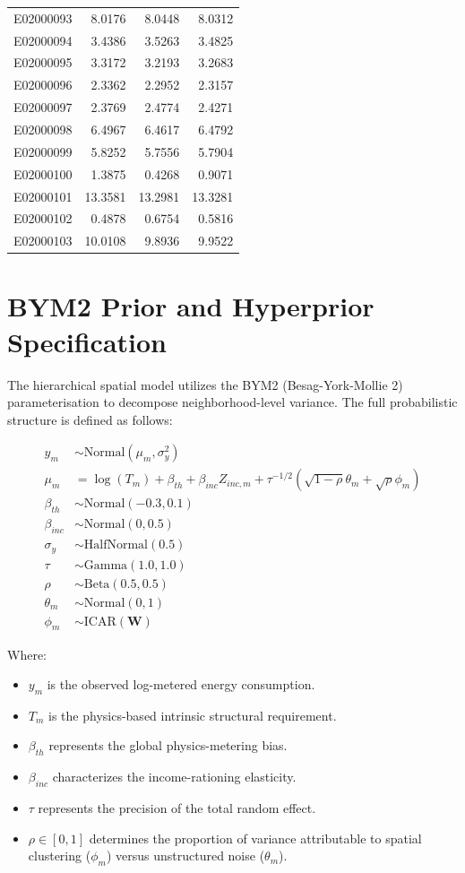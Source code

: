 \documentclass[11pt, a4paper]{article}
\begin{document}
\begin{longtable}{lrrr}
E02000093 & 8.0176 & 8.0448 & 8.0312 \\
E02000094 & 3.4386 & 3.5263 & 3.4825 \\
E02000095 & 3.3172 & 3.2193 & 3.2683 \\
E02000096 & 2.3362 & 2.2952 & 2.3157 \\
E02000097 & 2.3769 & 2.4774 & 2.4271 \\
E02000098 & 6.4967 & 6.4617 & 6.4792 \\
E02000099 & 5.8252 & 5.7556 & 5.7904 \\
E02000100 & 1.3875 & 0.4268 & 0.9071 \\
E02000101 & 13.3581 & 13.2981 & 13.3281 \\
E02000102 & 0.4878 & 0.6754 & 0.5816 \\
E02000103 & 10.0108 & 9.8936 & 9.9522 \\
\end{longtable}

\newpage
\section{BYM2 Prior and Hyperprior Specification}

The hierarchical spatial model utilizes the BYM2 (Besag-York-Mollie 2) 
parameterisation to decompose neighborhood-level variance. The full 
probabilistic structure is defined as follows:

\begin{align*}
y_{m} &\sim \text{Normal}(\mu_{m}, \sigma_y^2) \\
\mu_{m} &= \log(T_{m}) + \beta_{th} + \beta_{inc} Z_{inc, m} + \tau^{-1/2} (\sqrt{1 - \rho} \theta_m + \sqrt{\rho} \phi_m) \\
\beta_{th} &\sim \text{Normal}(-0.3, 0.1) \\
\beta_{inc} &\sim \text{Normal}(0, 0.5) \\
\sigma_y &\sim \text{HalfNormal}(0.5) \\
\tau &\sim \text{Gamma}(1.0, 1.0) \\
\rho &\sim \text{Beta}(0.5, 0.5) \\
\theta_m &\sim \text{Normal}(0, 1) \\
\phi_m &\sim \text{ICAR}(\bm{W})
\end{align*}

Where:
\begin{itemize}
    \item $y_m$ is the observed log-metered energy consumption.
    \item $T_m$ is the physics-based intrinsic structural requirement.
    \item $\beta_{th}$ represents the global physics-metering bias.
    \item $\beta_{inc}$ characterizes the income-rationing elasticity.
    \item $\tau$ represents the precision of the total random effect.
    \item $\rho \in [0, 1]$ determines the proportion of variance attributable to spatial clustering ($\phi_m$) versus unstructured noise ($\theta_m$).
\end{itemize}
\end{document}

